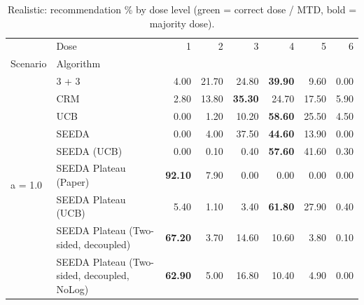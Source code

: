 \begin{table}[H]
\centering
\caption{Realistic: recommendation \% by dose level (green = correct dose / MTD, bold = majority dose).}
\label{tab:real_rec_by_dose}
\begin{tabular}{llrrrrrr}
\toprule
 & Dose & 1 & 2 & 3 & 4 & 5 & 6 \\
Scenario & Algorithm &  &  &  &  &  &  \\
\midrule
\multirow[c]{9}{*}{a = 1.0} & 3 + 3 & 4.00 & 21.70 & {\cellcolor[HTML]{C8E6C9}} 24.80 & \bfseries 39.90 & 9.60 & 0.00 \\
 & CRM & 2.80 & 13.80 & {\cellcolor[HTML]{C8E6C9}} \bfseries 35.30 & 24.70 & 17.50 & 5.90 \\
 & UCB & 0.00 & 1.20 & {\cellcolor[HTML]{C8E6C9}} 10.20 & \bfseries 58.60 & 25.50 & 4.50 \\
 & SEEDA & 0.00 & 4.00 & {\cellcolor[HTML]{C8E6C9}} 37.50 & \bfseries 44.60 & 13.90 & 0.00 \\
 & SEEDA (UCB) & 0.00 & 0.10 & {\cellcolor[HTML]{C8E6C9}} 0.40 & \bfseries 57.60 & 41.60 & 0.30 \\
 & SEEDA Plateau (Paper) & \bfseries 92.10 & 7.90 & {\cellcolor[HTML]{C8E6C9}} 0.00 & 0.00 & 0.00 & 0.00 \\
 & SEEDA Plateau (UCB) & 5.40 & 1.10 & {\cellcolor[HTML]{C8E6C9}} 3.40 & \bfseries 61.80 & 27.90 & 0.40 \\
 & SEEDA Plateau (Two-sided, decoupled) & \bfseries 67.20 & 3.70 & {\cellcolor[HTML]{C8E6C9}} 14.60 & 10.60 & 3.80 & 0.10 \\
 & SEEDA Plateau (Two-sided, decoupled, NoLog) & \bfseries 62.90 & 5.00 & {\cellcolor[HTML]{C8E6C9}} 16.80 & 10.40 & 4.90 & 0.00 \\
\bottomrule
\end{tabular}
\end{table}
